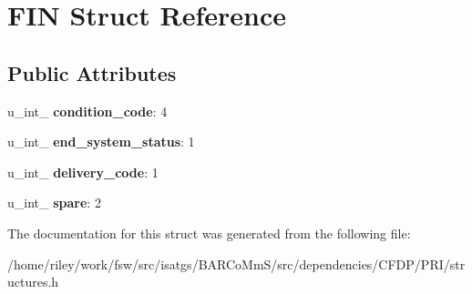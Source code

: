 \hypertarget{struct_f_i_n}{}\section{F\+IN Struct Reference}
\label{struct_f_i_n}
\subsection*{Public Attributes}
\begin{DoxyCompactItemize}
\item 
u\+\_\+int\+\_ {\bfseries condition\+\_\+code}\+: 4\hypertarget{struct_f_i_n_a016fb1f5c98239c8050e064e8523ed24}{}\label{struct_f_i_n_a016fb1f5c98239c8050e064e8523ed24}

\item 
u\+\_\+int\+\_ {\bfseries end\+\_\+system\+\_\+status}\+: 1\hypertarget{struct_f_i_n_a178747def8fb327bf011e9fcdc3ccae2}{}\label{struct_f_i_n_a178747def8fb327bf011e9fcdc3ccae2}

\item 
u\+\_\+int\+\_ {\bfseries delivery\+\_\+code}\+: 1\hypertarget{struct_f_i_n_ae2f8d59cd9662a0a5a475069337b0744}{}\label{struct_f_i_n_ae2f8d59cd9662a0a5a475069337b0744}

\item 
u\+\_\+int\+\_ {\bfseries spare}\+: 2\hypertarget{struct_f_i_n_a96bceefa2d73a04a6a382ddcd66c7c97}{}\label{struct_f_i_n_a96bceefa2d73a04a6a382ddcd66c7c97}

\end{DoxyCompactItemize}


The documentation for this struct was generated from the following file\+:\begin{DoxyCompactItemize}
\item 
/home/riley/work/fsw/src/isatgs/\+B\+A\+R\+Co\+Mm\+S/src/dependencies/\+C\+F\+D\+P/\+P\+R\+I/structures.\+h\end{DoxyCompactItemize}
